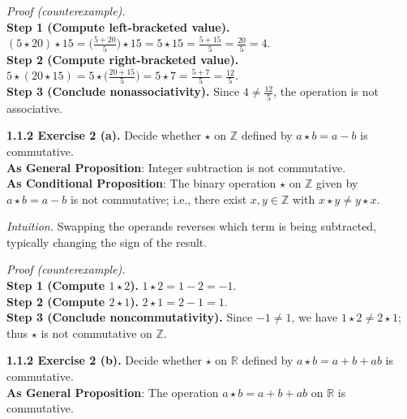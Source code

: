 \documentclass[12pt]{article}
\theoremstyle{definition}
\begin{document}
\dotfill

\emph{Proof (counterexample).}\\
\textbf{Step 1 (Compute left-bracketed value).} $(5\star 20)\star 15=\big(\tfrac{5+20}{5}\big)\star 15=5\star 15=\tfrac{5+15}{5}=\tfrac{20}{5}=4$.\\
\textbf{Step 2 (Compute right-bracketed value).} $5\star(20\star 15)=5\star\big(\tfrac{20+15}{5}\big)=5\star 7=\tfrac{5+7}{5}=\tfrac{12}{5}$.\\
\textbf{Step 3 (Conclude nonassociativity).} Since $4\neq \tfrac{12}{5}$, the operation is not associative.\\

\newpage

\noindent \textbf{1.1.2 Exercise 2 (a).} Decide whether $\star$ on $\mathbb{Z}$ defined by $a\star b=a-b$ is commutative.\\ %

\noindent\textbf{As General Proposition}: Integer subtraction is not commutative.\\

\noindent \textbf{As Conditional Proposition}: The binary operation $\star$ on $\mathbb{Z}$ given by $a\star b=a-b$ is not commutative; i.e., there exist $x,y\in\mathbb{Z}$ with $x\star y\neq y\star x$.

\newpage

\dotfill

\emph{Intuition.} Swapping the operands reverses which term is being subtracted, typically changing the sign of the result.\\

\dotfill

\emph{Proof (counterexample).}\\
\textbf{Step 1 (Compute $1\star2$).} $1\star 2=1-2=-1$.\\
\textbf{Step 2 (Compute $2\star1$).} $2\star 1=2-1=1$.\\
\textbf{Step 3 (Conclude noncommutativity).} Since $-1\neq 1$, we have $1\star2\neq 2\star1$; thus $\star$ is not commutative on $\mathbb{Z}$.\\


\newpage

\noindent \textbf{1.1.2 Exercise 2 (b).} Decide whether $\star$ on $\mathbb{R}$ defined by $a\star b=a+b+ab$ is commutative.\\ %

\noindent\textbf{As General Proposition}: The operation $a\star b=a+b+ab$ on $\mathbb{R}$ is commutative.\\
\end{document}
